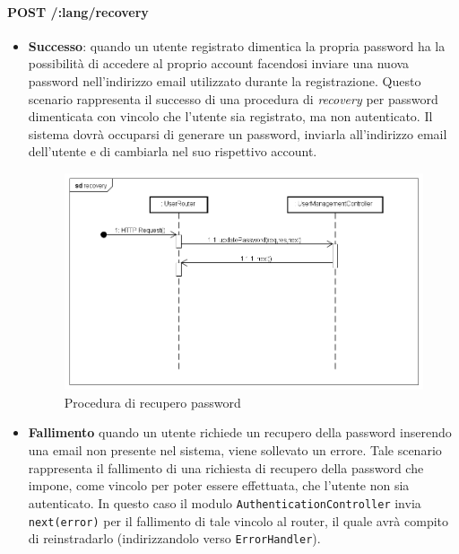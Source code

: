 \paragraph{POST /:lang/recovery}
\begin{itemize}
\item \textbf{Successo}: quando un utente registrato dimentica la propria password ha la possibilità di accedere al proprio account facendosi inviare una nuova password nell'indirizzo email utilizzato durante la registrazione. Questo scenario rappresenta il successo di una procedura di \textit{recovery} per password dimenticata con vincolo che l'utente sia registrato, ma non autenticato. Il sistema dovrà occuparsi di generare un password, inviarla all'indirizzo email dell'utente e di cambiarla nel suo rispettivo account.

\label{Procedura di recupero password}
\begin{figure}[ht]
	\centering
	\includegraphics[scale=0.40]{UML/DiagrammiDiSequenza/Back-end/POST__lang_recovery_success.png}
	\caption{Procedura di recupero password}
\end{figure}
\FloatBarrier

\item \textbf{Fallimento} quando un utente richiede un recupero della password inserendo una email non presente nel sistema, viene sollevato un errore. Tale scenario rappresenta il fallimento di una richiesta di recupero della password che impone, come vincolo per poter essere effettuata, che l'utente non sia autenticato. In questo caso il modulo \texttt{AuthenticationController} invia \texttt{next(error)} per il fallimento di tale vincolo al router, il quale avrà compito di reinstradarlo (indirizzandolo verso \texttt{ErrorHandler}).


\end{itemize}
